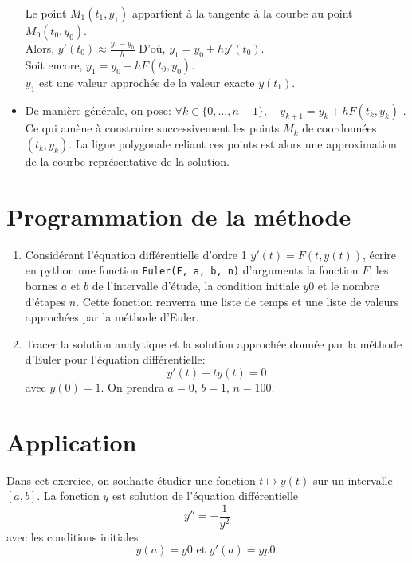 \begin{itemize}
\begin{minipage}{0.5\linewidth}
		Le point $M_1(t_1,y_1)$ appartient à la tangente à la courbe au point $M_0(t_0,y_0)$.\\
		Alors,   {$y'(t_0) \approx \displaystyle\frac{y_1-y_0}{h}$}
		D'où, $y_1=y_0+hy'(t_0)$.\\
		Soit encore,   {$y_1=y_0+hF(t_0,y_0)$.}\\
		$y_1$ est une valeur approchée de la valeur exacte $y(t_1)$.
		
	\end{minipage}
	
	
	
	\item De manière générale, on pose:
$\forall k\in\{0,\dots,n-1\},\quad  y_{k+1}=y_k+hF(t_k,y_k)$
. %
	Ce qui amène à construire successivement les points $M_k$ de coordonnées $(t_k,y_k)$. La ligne polygonale reliant ces points est alors une approximation de la courbe représentative de la solution.
\end{itemize}

\section{Programmation de la méthode }

\begin{enumerate}
	
	\item Considérant l'équation différentielle d'ordre 1 $y'(t)=F(t,y(t))$, écrire en python une fonction \texttt{Euler(F, a, b, n)} d'arguments la fonction $F$, les bornes $a$ et $b$ de l'intervalle d'étude, la condition initiale $y0$ et le nombre d'étapes $n$. Cette fonction renverra une liste de temps et une liste de valeurs approchées par la méthode d'Euler.
	
	\item Tracer la solution analytique et la solution approchée donnée par la méthode d'Euler pour l'équation différentielle:$$y'(t)+ty(t)=0$$ avec $y(0)=1$. On prendra $a=0$, $b=1$, $n=100$.
	
\end{enumerate}

\section{Application}

Dans cet exercice, on souhaite étudier une fonction $t\mapsto y(t)$ sur un intervalle $[a,b]$. La fonction $y$ est solution de l'équation différentielle $$y''=-\displaystyle\frac 1{y^2}$$ avec les conditions initiales $$y(a)=y0 \textrm{ et } y'(a)=yp0.$$

